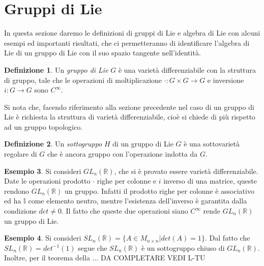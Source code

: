 \documentclass[12pt,a4paper]{report}
\theoremstyle{definition}
\newtheorem{Def}{Definizione}[chapter]
\theoremstyle{definition}
\newtheorem{Ex}[Def]{Esempio}
\theoremstyle{definition}
\theoremstyle{remark}
\begin{document}
\section{Gruppi di Lie}
In questa sezione daremo le definizioni di gruppi di Lie e algebra di Lie con alcuni esempi ed importanti risultati, che ci permetteranno di identificare l'algebra di Lie di un gruppo di Lie con il suo spazio tangente nell'identità.
\begin{Def}
	Un \textit{gruppo di Lie} $G$ è una varietà differenziabile con la struttura di gruppo, tale che le operazioni di moltiplicazione $\cdot:G\times G\rightarrow G$ e inversione $i:G\rightarrow G$ sono $C^\infty$.
\end{Def}
Si nota che, facendo riferimento alla sezione precedente nel caso di un gruppo di Lie è richiesta la struttura di varietà differenziabile, cioè si chiede di più rispetto ad un gruppo topologico.
\begin{Def}
	Un \textit{sottogruppo} $H$ di un gruppo di Lie $G$ è una sottovarietà regolare di $G$ che è ancora gruppo con l'operazione indotta da $G$.
\end{Def}
\begin{Ex}
	Si consideri $GL_n(\mathbb{R})$, che si è provato essere varietà differenziabile. Date le operazioni prodotto $\cdot$ righe per colonne e $i$ inverso di una matrice, queste rendono $GL_n(\mathbb{R})$ un gruppo. Infatti il prodotto righe per colonne è associativo ed ha $\mathbb{I}$ come elemento neutro, mentre l'esistenza dell'inverso è garantita dalla condizione $det\neq 0$. Il fatto che queste due operazioni siano $C^\infty$ rende $GL_n(\mathbb{R})$ un gruppo di Lie.
\end{Ex}
\begin{Ex}
	Si consideri $SL_n(\mathbb{R})=\{A\in M_{n\times n}| det(A)=1\}$. Dal fatto che $SL_n(\mathbb{R})=det^{-1}(1)$ segue che $SL_n(\mathbb{R})$ è un sottogruppo chiuso di $GL_n(\mathbb{R})$. Inoltre, per il teorema della ... DA COMPLETARE VEDI L-TU
\end{Ex}
\end{document}
